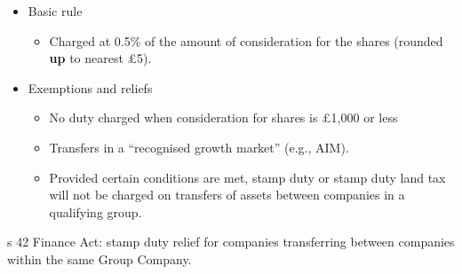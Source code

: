 \documentclass[
]{article}
\providecommand{\tightlist}{%
  \setlength{\itemsep}{0pt}\setlength{\parskip}{0pt}}
\begin{document}
\begin{itemize}
\tightlist
\item
  Basic rule

  \begin{itemize}
  \tightlist
  \item
    Charged at 0.5\% of the amount of consideration for the shares
    (rounded \textbf{up} to nearest £5).
  \end{itemize}
\item
  Exemptions and reliefs

  \begin{itemize}
  \tightlist
  \item
    No duty charged when consideration for shares is £1,000 or less
  \item
    Transfers in a ``recognised growth market'' (e.g., AIM).
  \item
    Provided certain conditions are met, stamp duty or stamp duty land
    tax will not be charged on transfers of assets between companies in
    a qualifying group.
  \end{itemize}
\end{itemize}

s 42 Finance Act: stamp duty relief for companies transferring between
companies within the same Group Company.
\end{document}
